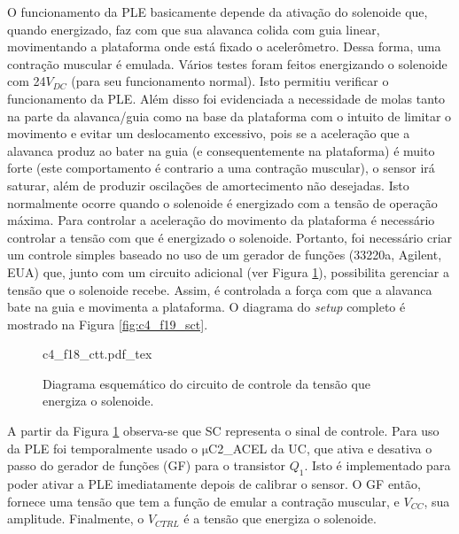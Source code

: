 O funcionamento da \acrshort{PLE} basicamente depende da ativação do solenoide que, quando energizado, faz com que sua alavanca colida com guia linear, movimentando a plataforma onde está fixado o acelerômetro. Dessa forma, uma contração muscular é emulada. Vários testes foram feitos energizando o solenoide com 24$V_{DC}$ (para seu funcionamento normal). Isto permitiu verificar o funcionamento da \acrshort{PLE}. Além disso foi evidenciada a necessidade de molas tanto na parte da alavanca/guia como na base da plataforma com o intuito de limitar o movimento e evitar um deslocamento excessivo, pois se a aceleração que a alavanca produz ao bater na guia (e consequentemente na plataforma) é muito forte (este comportamento é contrario a uma contração muscular), o sensor irá saturar, além de produzir oscilações de amortecimento não desejadas. Isto normalmente ocorre quando o solenoide é energizado com a tensão de operação máxima. Para controlar a aceleração do movimento da plataforma é necessário controlar a tensão com que é energizado o solenoide. Portanto, foi necessário criar um controle simples baseado no uso de um gerador de funções (33220a, Agilent, EUA) que, junto com um circuito adicional (ver Figura \ref{fig:c4_f18_ctt}), possibilita gerenciar a tensão que o solenoide recebe. Assim, é controlada a força com que a alavanca bate na guia e movimenta a plataforma. O diagrama do \textit{setup} completo é mostrado na Figura \ref{fig:c4_f19_sct}.


\begin{figure}
    \centering %
    \small %
    \def\svgwidth{0.7\columnwidth}%
    {c4_f18_ctt.pdf_tex}
    \caption{Diagrama esquemático do circuito de controle da tensão que energiza o solenoide.}
    \label{fig:c4_f18_ctt}
\end{figure}

A partir da Figura \ref{fig:c4_f18_ctt} observa-se que \acrshort{SC} representa o sinal de controle. Para uso da \acrshort{PLE} foi temporalmente usado o $\mathrm{\mu}$C2\_ACEL da \acrshort{UC}, que ativa e desativa o passo do gerador de funções (\acrshort{GF}) para o transistor $Q_1$. Isto é implementado para poder ativar a \acrshort{PLE} imediatamente depois de calibrar o sensor. O \acrshort{GF} então, fornece uma tensão que tem a função de emular a contração muscular, e $V_{CC}$, sua amplitude. Finalmente, o $V_{CTRL}$ é a tensão que energiza o solenoide.

